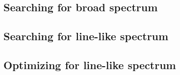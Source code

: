 \documentclass{article}%
\begin{document}
\subsection{Searching for broad spectrum}
\subsection{Searching for line-like spectrum}
\subsection{Optimizing for line-like spectrum}
%
%
%
\end{document}

